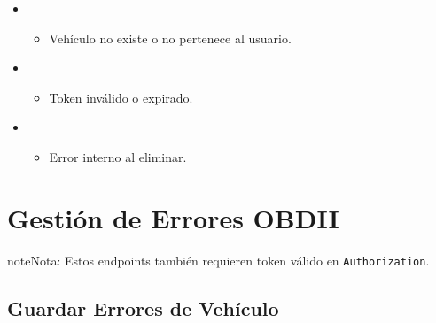 \documentclass[a4paper,11pt,spanish]{sphinxmanual}
\newcommand{\robotoMonoBold}{\fontseries{b}\selectfont\ttfamily}
\renewcommand{\sphinxcode}[1]{\textcolor{sphinxorangeCode}{{\robotoMonoBold #1}}}
\renewcommand{\sphinxupquote}[1]{\texttt{#1}}
\begin{document}
\begin{fulllineitems}
\begin{itemize}
\begin{itemize}
\end{itemize}

\item {} 
\sphinxAtStartPar
{}
\begin{itemize}
\item {} 
\sphinxAtStartPar
Vehículo no existe o no pertenece al usuario.

\end{itemize}

\begin{sphinxVerbatim}[commandchars=\\\{\}]
\end{sphinxVerbatim}

\item {} 
\sphinxAtStartPar
{}
\begin{itemize}
\item {} 
\sphinxAtStartPar
Token inválido o expirado.

\end{itemize}

\item {} 
\sphinxAtStartPar
{}
\begin{itemize}
\item {} 
\sphinxAtStartPar
Error interno al eliminar.

\end{itemize}

\end{itemize}

\end{fulllineitems}



\section{Gestión de Errores OBD\sphinxhyphen{}II}
\label{\detokenize{endpoints:gestion-de-errores-obd-ii}}
\begin{sphinxadmonition}{note}{Nota:}
\sphinxAtStartPar
Estos endpoints también requieren token válido en \sphinxcode{\sphinxupquote{Authorization}}.
\end{sphinxadmonition}


\subsection{Guardar Errores de Vehículo}
\label{\detokenize{endpoints:guardar-errores-de-vehiculo}}
\end{document}
